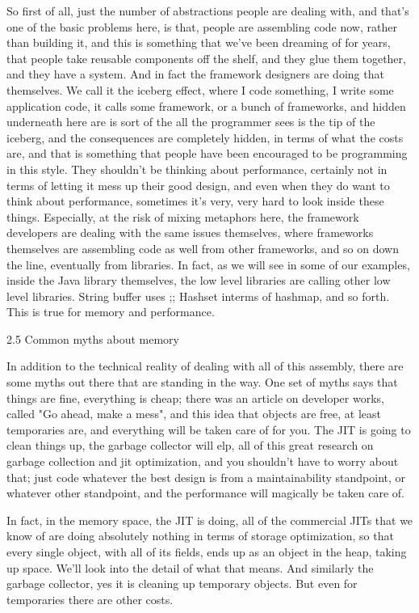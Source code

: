 So first of all, just the number of abstractions people are dealing with, and that's one of the basic problems here, is that, people are assembling code now, rather than building it, and this is something that we've been dreaming of for years, that people take reusable components off the shelf, and they glue them together, and they have a system.
And in fact the framework designers are doing that themselves.  We call it the iceberg effect, where I code something, I write some application code, it calls some framework, or a bunch of frameworks, and hidden underneath here are is sort of the all the programmer sees is the tip of the iceberg, and the consequences are completely hidden, in terms of what the costs are, and that is something that people have been encouraged to be programming in this style. They shouldn't be thinking about performance, certainly not in terms of letting it mess up their good design, and even when they do want to think about performance, sometimes it's very, very hard to look inside these things.  Especially, at the risk of mixing metaphors here, the framework developers are dealing with the same issues themselves, where frameworks themselves are assembling code as well from other frameworks, and so on down the line, eventually from libraries. In fact, as we will see in some of our examples, inside the Java library themselves, the low level libraries are calling other low level libraries.  String buffer uses ;;  Hashset interms of hashmap, and so forth.  This is true for memory and performance.

2.5 Common myths about memory

In addition to the technical reality of dealing with all of this assembly, there are some myths out there that are standing in the way.  One set of myths says that things are fine, everything is cheap; there was an article on developer works, called "Go ahead, make a mess",  and this idea that objects are free, at least temporaries are, and everything will be taken care of for you. The JIT is going to clean things up, the garbage collector will elp, all of this great research on garbage collection and jit optimization, and you shouldn't have to worry about that; just code whatever the best design is from a maintainability standpoint, or whatever other standpoint, and the performance will magically be taken care of.

In fact, in the memory space, the JIT is doing, all of the commercial JITs that we know of are doing absolutely nothing in terms of storage optimization, so that every single object, with all of its fields, ends up as an object in the heap, taking up space.  We'll look into the detail of what that means. And similarly the garbage collector, yes it is cleaning up temporary objects. But even for temporaries there are other costs. 


